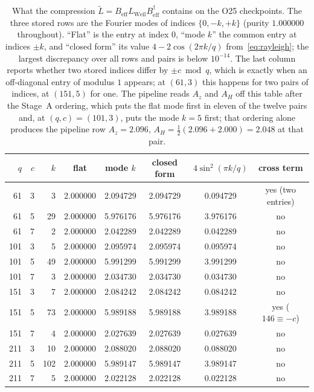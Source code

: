 \documentclass[11pt,a4paper]{article}
\begin{document}
    \begin{table}[ht]
      \centering
      \caption{What the compression $\tilde L = B_{\mathrm{eff}} L_{\mathrm{Weil}}
        B_{\mathrm{eff}}^\dagger$ contains on the O25 checkpoints.
        The three stored rows are the Fourier modes of indices $\{0, -k, +k\}$ (purity $1.000000$
        throughout). ``Flat'' is the entry at index $0$, ``mode $k$'' the common entry at indices
        $\pm k$, and ``closed form'' its value $4 - 2\cos(2\pi k/q)$ from~\eqref{eq:rayleigh};
        the largest discrepancy over all rows and pairs is below $10^{-14}$.
        The last column reports whether two stored indices differ by $\pm c \bmod q$, which is
        exactly when an off-diagonal entry of modulus $1$ appears; at $(61,3)$ this happens for two
        pairs of indices, at $(151,5)$ for one.
        The pipeline reads $A_z$ and $A_H$ off this table after the Stage~A ordering, which puts the
        flat mode first in eleven of the twelve pairs and, at $(q,c) = (101,3)$, puts the mode
        $k = 5$ first; that ordering alone produces the pipeline row $A_z = 2.096$,
        $A_H = \tfrac12(2.096 + 2.000) = 2.048$ at that pair.}
      \label{tab:numerical}
      \smallskip
      \begin{tabular}{rrrccccc}
        \hline
        $q$ & $c$ & $k$ & flat & mode $k$ & closed form & $4\sin^2(\pi k/q)$ & cross term \\
        \hline
        61 &  3 &   3 & 2.000000 & 2.094729 & 2.094729 & 0.094729 & yes (two entries) \\
        61 &  5 &  29 & 2.000000 & 5.976176 & 5.976176 & 3.976176 & no  \\
        61 &  7 &   2 & 2.000000 & 2.042289 & 2.042289 & 0.042289 & no  \\
        101 &  3 &   5 & 2.000000 & 2.095974 & 2.095974 & 0.095974 & no  \\
        101 &  5 &  49 & 2.000000 & 5.991299 & 5.991299 & 3.991299 & no  \\
        101 &  7 &   3 & 2.000000 & 2.034730 & 2.034730 & 0.034730 & no  \\
        151 &  3 &   7 & 2.000000 & 2.084242 & 2.084242 & 0.084242 & no  \\
        151 &  5 &  73 & 2.000000 & 5.989188 & 5.989188 & 3.989188 & yes ($146 \equiv -c$) \\
        151 &  7 &   4 & 2.000000 & 2.027639 & 2.027639 & 0.027639 & no  \\
        211 &  3 &  10 & 2.000000 & 2.088020 & 2.088020 & 0.088020 & no  \\
        211 &  5 & 102 & 2.000000 & 5.989147 & 5.989147 & 3.989147 & no  \\
        211 &  7 &   5 & 2.000000 & 2.022128 & 2.022128 & 0.022128 & no  \\
        \hline
      \end{tabular}
    \end{table}
\end{document}
